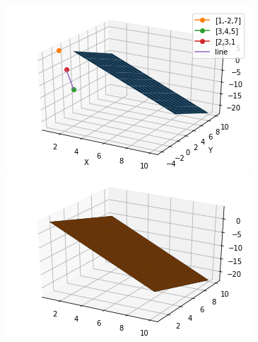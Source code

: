 \documentclass[journal,12pt,twocolumn]{IEEEtran}
\begin{document}
\includegraphics{Figure_3}
\includegraphics{Figure_4}






\end{document}
